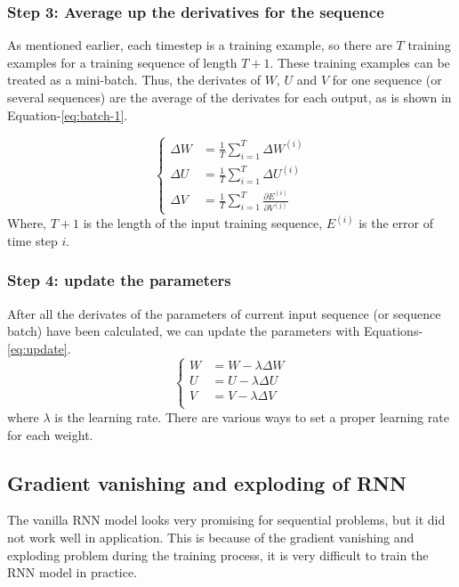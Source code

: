 \documentclass{article}
\begin{document}
\subsubsection{Step 3: Average up the derivatives for the sequence}
As mentioned earlier, each timestep is a training example, so there are $T$ training examples for a training sequence of length $T+1$.
These training examples can be treated as a mini-batch.  Thus, the derivates of $W$, $U$ and $V$ for one sequence (or several sequences) are the
average of the derivates for each output, as is shown in Equation-\ref{eq:batch-1}.
 
 \begin{equation}\label{eq:batch-1}\begin{cases}
\Delta W &=  \frac{1}{T}\sum\limits_{i=1}^T\Delta W^{(i)}\\
\Delta U &=  \frac{1}{T}\sum\limits_{i=1}^T\Delta U^{(i)}\\
\Delta V &=  \frac{1}{T}\sum\limits_{i=1}^T\frac{\partial E^{(i)}}{\partial V^{(j)}}
\end{cases}\end{equation}
Where, $T+1$ is the length of the input training sequence, $E^{(i)}$ is the error of time step $i$.

\subsubsection{Step 4: update the parameters} 
After all the derivates of the parameters of current input sequence (or sequence batch) have been calculated, we can update the parameters with Equations-\ref{eq:update}.
\begin{equation}\label{eq:update}\begin{cases}
W &= W  - \lambda \Delta W\\
U &= U - \lambda \Delta U\\
V &= V - \lambda \Delta V\\
\end{cases}\end{equation}
where $\lambda$ is the learning rate. There are various ways to set a proper learning rate for each weight.


\subsection{Gradient vanishing and exploding of RNN}
The vanilla RNN model looks very promising for sequential problems, but it did not work well in application.  
This is because of the gradient vanishing and exploding problem during the training process, it is very difficult to train the RNN model in practice.
\end{document}
